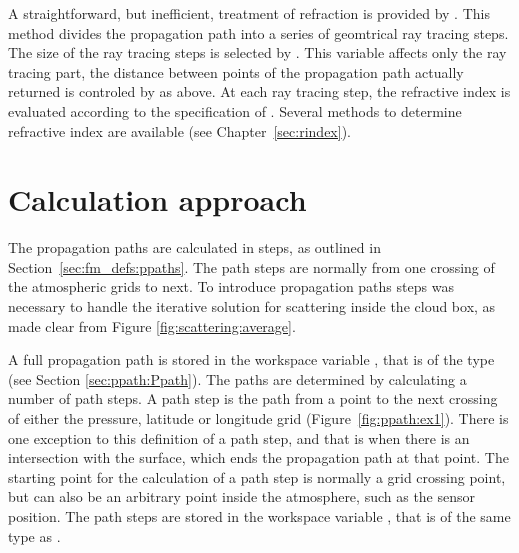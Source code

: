 A straightforward, but inefficient, treatment of refraction is provided by
. This method divides the propagation path
into a series of geomtrical ray tracing steps. The size of the ray tracing
steps is selected by . This variable affects only
the ray tracing part, the distance between points of the propagation path
actually returned is controled by  as above. At each
ray tracing step, the refractive index is evaluated according to the
specification of . Several methods to
determine refractive index are available (see Chapter~\ref{sec:rindex}).



\section{Calculation approach}
\label{sec:ppath:approach}

The propagation paths are calculated in steps, as outlined in
Section~\ref{sec:fm_defs:ppaths}. The path steps are normally from one crossing
of the atmospheric grids to next. To introduce
propagation paths steps was necessary to handle the iterative solution for
scattering inside the cloud box, as made clear from Figure
\ref{fig:scattering:average}.

A full propagation path is stored in the workspace variable ,
that is of the type  (see Section \ref{sec:ppath:Ppath}). The
paths are determined by calculating a number of path steps. A path step is the
path from a point to the next crossing of either the pressure, latitude or
longitude grid (Figure~\ref{fig:ppath:ex1}). There is one exception to this
definition of a path step, and that is when there is an intersection with the
surface, which ends the propagation path at that point. The starting point for
the calculation of a path step is normally a grid crossing point, but can also
be an arbitrary point inside the atmosphere, such as the sensor position. The
path steps are stored in the workspace variable , that is
of the same type as .


